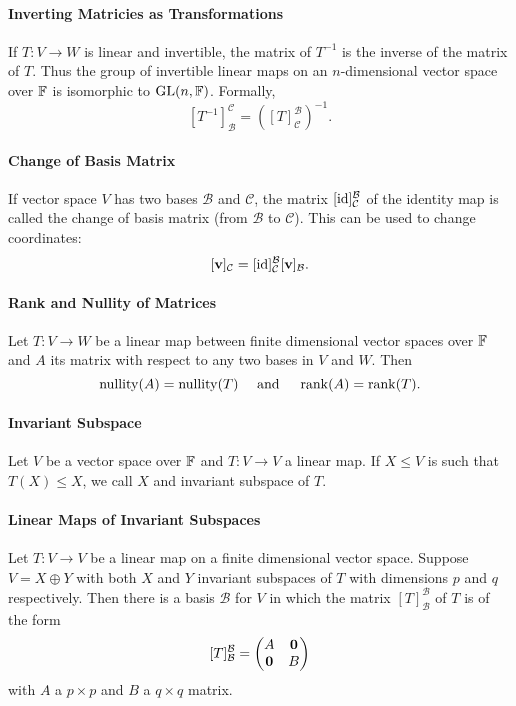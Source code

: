 \paragraph{Inverting Matricies as Transformations}
If \(T: V \to W\) is linear and invertible, the matrix of \(T^{-1}\) is the inverse of the matrix of \(T\). Thus the group of invertible linear maps on an \(n\)-dimensional vector space over \(\mathbb{F}\) is isomorphic to \(\operatorname{GL}(n,\mathbb{F})\). Formally,
\[[T^{-1}]_\mathcal{B}^\mathcal{C} = ([T]_\mathcal{C}^\mathcal{B})^{-1}.\]

\paragraph{Change of Basis Matrix}
If vector space \(V\) has two bases \(\mathcal{B}\) and \(\mathcal{C}\), the matrix \([\mathrm{id}]_\mathcal{C}^\mathcal{B}\) of the identity map is called the change of basis matrix (from \(\mathcal{B}\) to \(\mathcal{C}\)). This can be used to change coordinates:
\[[\mathbf{v}]_\mathcal{C} = [\mathrm{id}]_\mathcal{C}^\mathcal{B}[\mathbf{v}]_\mathcal{B}.\]

\paragraph{Rank and Nullity of Matrices}
Let \(T: V \to W\) be a linear map between finite dimensional vector spaces over \(\mathbb{F}\) and \(A\) its matrix with respect to any two bases in \(V\) and \(W\). Then
\[\mathrm{nullity}(A) = \mathrm{nullity}(T) \quad \text{ and } \quad \rank(A) = \rank(T).\]

\paragraph{Invariant Subspace}
Let \(V\) be a vector space over \(\mathbb{F}\) and \(T: V \to V\) a linear map. If \(X \leq V\) is such that \(T(X) \leq X\), we call \(X\) and invariant subspace of \(T\).

\paragraph{Linear Maps of Invariant Subspaces}
Let \(T: V \to V\) be a linear map on a finite dimensional vector space. Suppose \(V = X \oplus Y\) with both \(X\) and \(Y\) invariant subspaces of \(T\) with dimensions \(p\) and \(q\) respectively. Then there is a basis \(\mathcal{B}\) for \(V\) in which the matrix \([T]_\mathcal{B}^\mathcal{B}\) of \(T\) is of the form
\[[T]_\mathcal{B}^\mathcal{B} = \begin{pmatrix}
    A & \mathbf{0} \\
    \mathbf{0} & B
\end{pmatrix}
\]
with \(A\) a \(p \times p\) and \(B\) a \(q \times q\) matrix.

